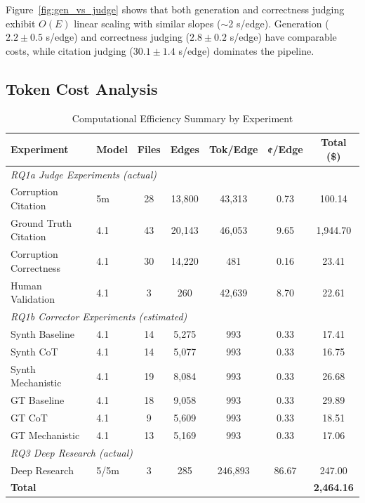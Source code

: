 \documentclass{article}
\begin{document}
Figure~\ref{fig:gen_vs_judge} shows that both generation and correctness judging exhibit $O(E)$ linear scaling with similar slopes ($\sim$2 s/edge). Generation ($2.2 \pm 0.5$ s/edge) and correctness judging ($2.8 \pm 0.2$ s/edge) have comparable costs, while citation judging ($30.1 \pm 1.4$ s/edge) dominates the pipeline.

\subsection{Token Cost Analysis}

\begin{table}[H]
\centering
\caption{Computational Efficiency Summary by Experiment}
\label{tab:scaling_summary}
\footnotesize
\begin{tabular}{llccccc}
\toprule
\textbf{Experiment} & \textbf{Model} & \textbf{Files} & \textbf{Edges} & \textbf{Tok/Edge} & \textbf{¢/Edge} & \textbf{Total (\$)} \\
\midrule
\multicolumn{7}{l}{\textit{RQ1a Judge Experiments (actual)}} \\
Corruption Citation & 5m & 28 & 13,800 & 43,313 & 0.73 & 100.14 \\
Ground Truth Citation & 4.1 & 43 & 20,143 & 46,053 & 9.65 & 1,944.70 \\
Corruption Correctness & 4.1 & 30 & 14,220 & 481 & 0.16 & 23.41 \\
Human Validation & 4.1 & 3 & 260 & 42,639 & 8.70 & 22.61 \\
\midrule
\multicolumn{7}{l}{\textit{RQ1b Corrector Experiments (estimated)}} \\
Synth Baseline & 4.1 & 14 & 5,275 & 993 & 0.33 & 17.41 \\
Synth CoT & 4.1 & 14 & 5,077 & 993 & 0.33 & 16.75 \\
Synth Mechanistic & 4.1 & 19 & 8,084 & 993 & 0.33 & 26.68 \\
GT Baseline & 4.1 & 18 & 9,058 & 993 & 0.33 & 29.89 \\
GT CoT & 4.1 & 9 & 5,609 & 993 & 0.33 & 18.51 \\
GT Mechanistic & 4.1 & 13 & 5,169 & 993 & 0.33 & 17.06 \\
\midrule
\multicolumn{7}{l}{\textit{RQ3 Deep Research (actual)}} \\
Deep Research & 5/5m & 3 & 285 & 246,893 & 86.67 & 247.00 \\
\midrule
\textbf{Total} & & & & & & \textbf{2,464.16} \\
\bottomrule
\end{tabular}

\end{table}
\end{document}
